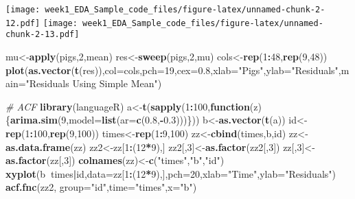 \documentclass[]{article}
\newenvironment{Shaded}{\begin{snugshade}}{\end{snugshade}}
\newcommand{\CommentTok}[1]{\textcolor[rgb]{0.56,0.35,0.01}{\textit{#1}}}
\newcommand{\ControlFlowTok}[1]{\textcolor[rgb]{0.13,0.29,0.53}{\textbf{#1}}}
\newcommand{\DataTypeTok}[1]{\textcolor[rgb]{0.13,0.29,0.53}{#1}}
\newcommand{\DecValTok}[1]{\textcolor[rgb]{0.00,0.00,0.81}{#1}}
\newcommand{\FloatTok}[1]{\textcolor[rgb]{0.00,0.00,0.81}{#1}}
\newcommand{\KeywordTok}[1]{\textcolor[rgb]{0.13,0.29,0.53}{\textbf{#1}}}
\newcommand{\NormalTok}[1]{#1}
\newcommand{\OperatorTok}[1]{\textcolor[rgb]{0.81,0.36,0.00}{\textbf{#1}}}
\newcommand{\StringTok}[1]{\textcolor[rgb]{0.31,0.60,0.02}{#1}}
\begin{document}
\texttt{[image: week1\_EDA\_Sample\_code\_files/figure-latex/unnamed-chunk-2-12.pdf]}
\texttt{[image: week1\_EDA\_Sample\_code\_files/figure-latex/unnamed-chunk-2-13.pdf]}

\begin{Shaded}
\begin{Highlighting}[]
\NormalTok{mu<-}\KeywordTok{apply}\NormalTok{(pigs,}\DecValTok{2}\NormalTok{,mean)}
\NormalTok{res<-}\KeywordTok{sweep}\NormalTok{(pigs,}\DecValTok{2}\NormalTok{,mu)}
\NormalTok{cols<-}\KeywordTok{rep}\NormalTok{(}\DecValTok{1}\OperatorTok{:}\DecValTok{48}\NormalTok{,}\KeywordTok{rep}\NormalTok{(}\DecValTok{9}\NormalTok{,}\DecValTok{48}\NormalTok{))}
\KeywordTok{plot}\NormalTok{(}\KeywordTok{as.vector}\NormalTok{(}\KeywordTok{t}\NormalTok{(res)),}\DataTypeTok{col=}\NormalTok{cols,}\DataTypeTok{pch=}\DecValTok{19}\NormalTok{,}\DataTypeTok{cex=}\FloatTok{0.8}\NormalTok{,}\DataTypeTok{xlab=}\StringTok{"Pigs"}\NormalTok{,}\DataTypeTok{ylab=}\StringTok{"Residuals"}\NormalTok{,}\DataTypeTok{main=}\StringTok{"Residuals Using Simple Mean"}\NormalTok{)}


\CommentTok{# ACF}
\KeywordTok{library}\NormalTok{(languageR)}
\NormalTok{a<-}\KeywordTok{t}\NormalTok{(}\KeywordTok{sapply}\NormalTok{(}\DecValTok{1}\OperatorTok{:}\DecValTok{100}\NormalTok{,}\ControlFlowTok{function}\NormalTok{(z)\{}\KeywordTok{arima.sim}\NormalTok{(}\DecValTok{9}\NormalTok{,}\DataTypeTok{model=}\KeywordTok{list}\NormalTok{(}\DataTypeTok{ar=}\KeywordTok{c}\NormalTok{(}\FloatTok{0.8}\NormalTok{,}\OperatorTok{-}\FloatTok{0.3}\NormalTok{)))\}))}
\NormalTok{b<-}\KeywordTok{as.vector}\NormalTok{(}\KeywordTok{t}\NormalTok{(a))}
\NormalTok{id<-}\KeywordTok{rep}\NormalTok{(}\DecValTok{1}\OperatorTok{:}\DecValTok{100}\NormalTok{,}\KeywordTok{rep}\NormalTok{(}\DecValTok{9}\NormalTok{,}\DecValTok{100}\NormalTok{))}
\NormalTok{times<-}\KeywordTok{rep}\NormalTok{(}\DecValTok{1}\OperatorTok{:}\DecValTok{9}\NormalTok{,}\DecValTok{100}\NormalTok{)}
\NormalTok{zz<-}\KeywordTok{cbind}\NormalTok{(times,b,id)}
\NormalTok{zz<-}\KeywordTok{as.data.frame}\NormalTok{(zz)}
\NormalTok{zz2<-zz[}\DecValTok{1}\OperatorTok{:}\NormalTok{(}\DecValTok{12}\OperatorTok{*}\DecValTok{9}\NormalTok{),]}
\NormalTok{zz2[,}\DecValTok{3}\NormalTok{]<-}\KeywordTok{as.factor}\NormalTok{(zz2[,}\DecValTok{3}\NormalTok{])}
\NormalTok{zz[,}\DecValTok{3}\NormalTok{]<-}\KeywordTok{as.factor}\NormalTok{(zz[,}\DecValTok{3}\NormalTok{])}
\KeywordTok{colnames}\NormalTok{(zz)<-}\KeywordTok{c}\NormalTok{(}\StringTok{"times"}\NormalTok{,}\StringTok{"b"}\NormalTok{,}\StringTok{"id"}\NormalTok{)}
\KeywordTok{xyplot}\NormalTok{(b}\OperatorTok{~}\NormalTok{times}\OperatorTok{|}\NormalTok{id,}\DataTypeTok{data=}\NormalTok{zz[}\DecValTok{1}\OperatorTok{:}\NormalTok{(}\DecValTok{12}\OperatorTok{*}\DecValTok{9}\NormalTok{),],}\DataTypeTok{pch=}\DecValTok{20}\NormalTok{,}\DataTypeTok{xlab=}\StringTok{"Time"}\NormalTok{,}\DataTypeTok{ylab=}\StringTok{"Residuals"}\NormalTok{)}
\KeywordTok{acf.fnc}\NormalTok{(zz2, }\DataTypeTok{group=}\StringTok{"id"}\NormalTok{,}\DataTypeTok{time=}\StringTok{"times"}\NormalTok{,}\DataTypeTok{x=}\StringTok{"b"}\NormalTok{)}


\end{Highlighting}
\end{Shaded}
\end{document}
